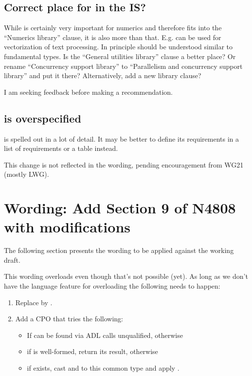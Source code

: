 \subsection{Correct place for  in the IS?}

While  is certainly very important for numerics and therefore fits into the “Numerics library” clause, it is also more than that.
E.g.  can be used for vectorization of text processing.
In principle  should be understood similar to fundamental types.
Is the “General utilities library” clause a better place?
Or rename “Concurrency support library” to “Parallelism and concurrency support library” and put it there?
Alternatively, add a new library clause?

I am seeking feedback before making a recommendation.

\subsection{ is overspecified}
 is spelled out in a lot of detail.
It may be better to define its requirements in a list of requirements or a table instead.

This change is not reflected in the wording, pending encouragement from WG21 (mostly LWG).

\section{Wording: Add Section 9 of N4808 with modifications}\label{sec:wording}

The following section presents the wording to be applied against the \CC{}
working draft.

This wording overloads  even though that's not possible (yet).
As long as we don't have the language feature for overloading  the following needs to happen:
\begin{enumerate}
  \item Replace  by .
  \item Add a \std{} CPO that tries the following:
    \begin{itemize}
      \item If  can be found via ADL calls  unqualified, otherwise
      \item if  is well-formed, return its result, otherwise
      \item if \std{} exists, cast  and  to this common type and apply .
    \end{itemize}
\end{enumerate}

